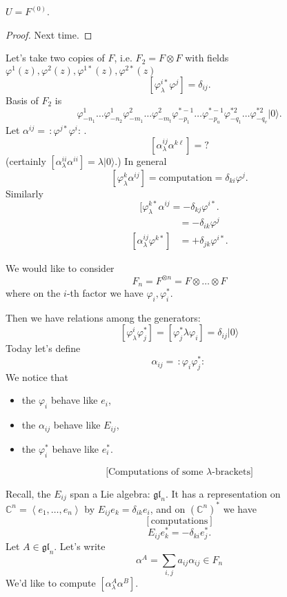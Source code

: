 \begin{proposition}
\label{proposition-U-is-F0}
$U=F^{(0)}$.
\end{proposition}

\begin{proof}
Next time.
\end{proof}

\medskip\noindent
Let's take two copies of $F$,
i.e. $F_2=F \otimes F$ 
with fields $\varphi^1(z),\varphi^2(z),\varphi^{1*}(z),\varphi^{2*}(z)$
$$
[\varphi^{i*}_{\lambda}\varphi^j]=\delta_{ij}.
$$
Basis of $F_2$ is
$$
\varphi_{-n_1}^1\ldots \varphi_{-n_2}^1\varphi_{-m_1}^2\ldots
\varphi_{-m_t}^2\varphi^{*-1}_{-p_1}\ldots
\varphi_{-p_u}^{*-1}\varphi_{-q_1}^{*2}\ldots\varphi_{-q_v}^{*2}|0\rangle.
$$
Let $\alpha^{ij}=\,:\!\varphi^{j*}\varphi^i\!:\,$.
$$
[\alpha^{ij}_\lambda \alpha^{k\ell}]=?
$$
(certainly $[\alpha^{ii}_\lambda \alpha^{ii}]=\lambda |0\rangle$.)
In general
$$
[\varphi^k_\lambda \alpha^{ij}]=\text{computation}=\delta_{ki}\varphi^j.
$$
Similarly
$$
[\varphi^{k*}_\lambda \alpha^{ij}=-\delta_{kj}\varphi^{i*}.
$$
\begin{align*}
[\alpha^{ij}_\lambda \varphi^k]&=-\delta_{ik}\varphi^j\\
[\alpha^{ij}_\lambda \varphi^{k*}]&=+\delta_{j k}\varphi^{i*}.
\end{align*}

We would like to consider
$$
F_n=F^{\otimes n}=F \otimes \ldots \otimes F
$$
where on the $i$-th factor we have $\varphi_i,\varphi^*_i$.

Then we have relations among the generators:
$$
[\varphi^i_\lambda \varphi_j^* ]=[\varphi^* _j\lambda\varphi_i]
=\delta_{ij}|0\rangle
$$
Today let's define
$$
\alpha_{ij}=\,:\!\varphi_i \varphi^*_j\!:\,
$$
We notice that
\begin{itemize}
\item the $\varphi_i$ behave like $e_i$,
\item the $\alpha_{ij}$ behave like $E_{ij}$,
\item the $\varphi_i^*$ behave like $e_i^*$.
\end{itemize}

$$
\text{[Computations of some $\lambda$-brackets]}
$$

Recall, the $E_{ij}$ span a Lie algebra: $\mathfrak{gl}_n$.
It has a representation on $\mathbb{C}^n=\left<e_1,\ldots,e_n\right>$ 
by $E_{ij}e_k=\delta_{ik}e_i$,
and on $(\mathbb{C}^n)^*$ we have
$$
[\text{computations}]
$$
$$
E_{ij}e_k^* =-\delta_{ki}e_j^*.
$$
Let $A \in \mathfrak{gl}_n$. Let's write
$$
\alpha^A=\sum_{i,j}a_{ij}\alpha_{ij}\in F_n
$$
We'd like to compute $[\alpha^A_\lambda \alpha^B]$.

